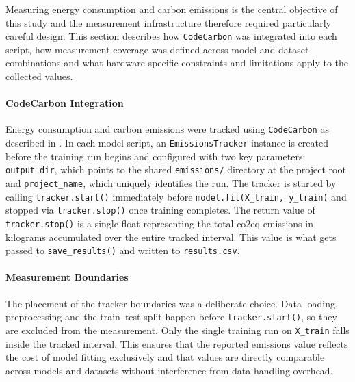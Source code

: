 Measuring energy consumption and carbon emissions is the central objective of this study and the measurement infrastructure therefore required particularly careful design. This section describes how \texttt{CodeCarbon} was integrated into each script, how measurement coverage was defined across model and dataset combinations and what hardware-specific constraints and limitations apply to the collected values.

\paragraph{CodeCarbon Integration}
Energy consumption and carbon emissions were tracked using \texttt{CodeCarbon} as described in . In each model script, an \texttt{EmissionsTracker} instance is created before the training run begins and configured with two key parameters: \texttt{output\_dir}, which points to the shared \texttt{emissions/} directory at the project root and \texttt{project\_name}, which uniquely identifies the run. The tracker is started by calling \texttt{tracker.start()} immediately before \texttt{model.fit(X\_train, y\_train)} and stopped via \texttt{tracker.stop()} once training completes. The return value of \texttt{tracker.stop()} is a single float representing the total \gls{co2eq} emissions in kilograms accumulated over the entire tracked interval. This value is what gets passed to \texttt{save\_results()} and written to \texttt{results.csv}.

\paragraph{Measurement Boundaries}
The placement of the tracker boundaries was a deliberate choice. Data loading, preprocessing and the train--test split happen before \texttt{tracker.start()}, so they are excluded from the measurement. Only the single training run on \texttt{X\_train} falls inside the tracked interval. This ensures that the reported emissions value reflects the cost of model fitting exclusively and that values are directly comparable across models and datasets without interference from data handling overhead.

